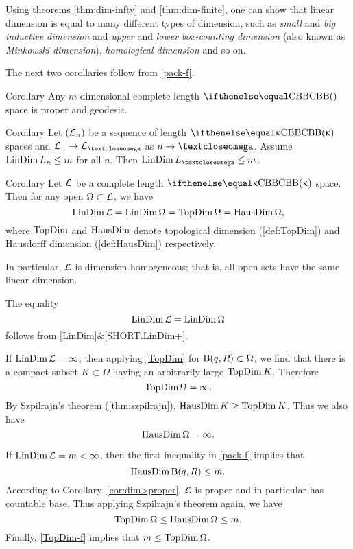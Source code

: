 Using theorems \ref{thm:dim-infty} and \ref{thm:dim-finite}, 
one can show that linear dimension is equal to many different types of dimension, such 
as {}\emph{small} and \emph{big inductive dimension} 
and {}\emph{upper} and  \emph{lower box-counting dimension}
(also known as \emph{Minkowski dimension}), 
\emph{homological dimension} and so on.

The next two corollaries follow from \ref{pack-f}.

\begin{thm}{Corollary}\label{cor:dim>proper}
Any $m$-dimensional complete length $\Alex{}$ space is proper and geodesic.
\end{thm}


\begin{thm}{Corollary} Let $(\mathcal{L}_n)$ be a sequence of length $\Alex\kappa$ spaces and $\spc{L}_n\to \spc{L}_\o$ as $n\to\o$.
Assume $\LinDim L_n\le m$ for all $n$.
Then $\LinDim L_\o\le m$.
\end{thm}

\begin{thm}{Corollary}\label{dim=dim} 
Let $\mathcal{L}$ be a complete length $\Alex{\kappa}$ space. 
Then for any open $\Omega\subset \spc{L}$, we have
\[
\mathop{\rm LinDim}\nolimits \mathcal{L}=
\mathop{\rm LinDim}\nolimits\Omega =
\mathop{\rm TopDim}\nolimits\Omega=
\mathop{\rm HausDim}\nolimits\Omega,
\]
where $\mathop{\rm TopDim}\nolimits$ and $\mathop{\rm HausDim}\nolimits$ denote  topological dimension (\ref{def:TopDim}) and Hausdorff dimension (\ref{def:HausDim}) respectively.

In particular, $\mathcal{L}$ is dimension-homogeneous; that is, all open sets have the same linear dimension.
\end{thm}

The equality
\[\mathop{\rm LinDim}\nolimits \mathcal{L}= \mathop{\rm LinDim}\nolimits\Omega\]
follows from \ref{LinDim}$\&$\ref{SHORT.LinDim+}.

If $\mathop{\rm LinDim}\nolimits \mathcal{L}=\infty$, then
applying  \ref{TopDim} for $\oBall(q,R)\subset \Omega$, we find that there is a compact subset $K\subset \Omega$ having an arbitrarily large $\mathop{\rm TopDim}\nolimits K$. Therefore
\[\mathop{\rm TopDim}\nolimits\Omega=\infty.\] 
By Szpilrajn's theorem (\ref{thm:szpilrajn}),
$\HausDim K\ge \TopDim K$.
Thus we also have 
\[\mathop{\rm HausDim}\nolimits\Omega=\infty.\]

If $\mathop{\rm LinDim}\nolimits \mathcal{L}=m<\infty$, then the first inequality in \ref{pack-f} 
implies that \[\HausDim \oBall(q,R)\le m.\] 
According to Corollary~\ref{cor:dim>proper}, 
$\mathcal{L}$ is proper and in particular has countable base. 
Thus applying Szpilrajn's theorem  again, we have
\[\TopDim\Omega\le \HausDim \Omega\le m.\]
Finally, \ref{TopDim-f} implies that $m\le\TopDim\Omega$.
\qeds


